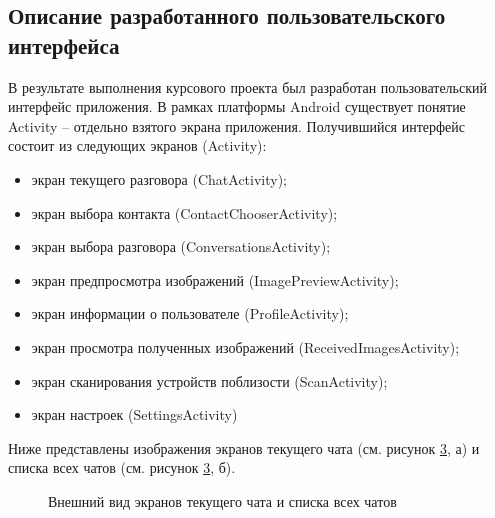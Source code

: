 \subsection{Описание разработанного пользовательского интерфейса}
\label{sub:gui_design:description}

В результате выполнения курсового проекта был разработан пользовательский интерфейс приложения.
В рамках платформы Android существует понятие Activity -- отдельно взятого экрана приложения.
Получившийся интерфейс состоит из следующих экранов (Activity):
\begin{itemize}
	\item экран текущего разговора (ChatActivity);
	\item экран выбора контакта (ContactChooserActivity);
	\item экран выбора разговора (ConversationsActivity);
	\item экран предпросмотра изображений (ImagePreviewActivity);
	\item экран информации о пользователе (ProfileActivity);
	\item экран просмотра полученных изображений (ReceivedImagesActivity);
	\item экран сканирования устройств поблизости (ScanActivity);
	\item экран настроек (SettingsActivity)
\end{itemize}

Ниже представлены изображения экранов текущего чата (см. рисунок \ref{fig:chat_and_conversations_activities}, а) и списка всех чатов (см. рисунок \ref{fig:chat_and_conversations_activities}, б).


\begin{figure}[ht]
	\centering
	\begin{subfigure}[t]{0.48\textwidth}
	    \centering                                                           
		\label{fig:chat_activity}
		\caption{}
	\end{subfigure}
	\begin{subfigure}[t]{0.48\textwidth}
	    \centering                                                           
		\label{fig:conversations_activity}
		\caption{}
	\end{subfigure}
	\caption{Внешний вид экранов текущего чата и списка всех чатов}
	\label{fig:chat_and_conversations_activities}
\end{figure}

